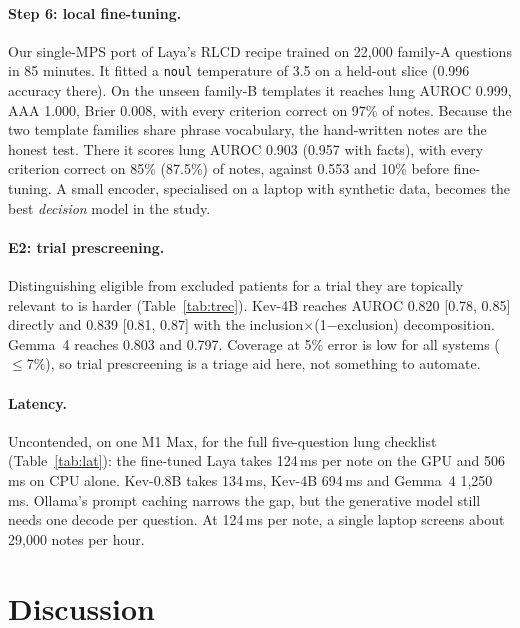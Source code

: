 \documentclass[11pt]{article}
\begin{document}
\paragraph{Step 6: local fine-tuning.}
Our single-MPS port of Laya's RLCD recipe trained on 22{,}000 family-A questions in 85 minutes. It fitted a \texttt{noul} temperature of 3.5 on a held-out slice (0.996 accuracy there).
On the unseen family-B templates it reaches lung AUROC 0.999, AAA 1.000, Brier 0.008, with every criterion correct on 97\% of notes.
Because the two template families share phrase vocabulary, the hand-written notes are the honest test.
There it scores lung AUROC 0.903 (0.957 with facts), with every criterion correct on 85\% (87.5\%) of notes, against 0.553 and 10\% before fine-tuning.
A small encoder, specialised on a laptop with synthetic data, becomes the best \emph{decision} model in the study.


\paragraph{E2: trial prescreening.}
Distinguishing eligible from excluded patients for a trial they are topically relevant to is harder (Table~\ref{tab:trec}).
Kev-4B reaches AUROC 0.820 [0.78, 0.85] directly and 0.839 [0.81, 0.87] with the inclusion$\times$(1$-$exclusion) decomposition.
Gemma~4 reaches 0.803 and 0.797.
Coverage at 5\% error is low for all systems ($\leq$7\%), so trial prescreening is a triage aid here, not something to automate.


\paragraph{Latency.}
Uncontended, on one M1 Max, for the full five-question lung checklist (Table~\ref{tab:lat}): the fine-tuned Laya takes 124\,ms per note on the GPU and 506\,ms on CPU alone.
Kev-0.8B takes 134\,ms, Kev-4B 694\,ms and Gemma~4 1{,}250\,ms.
Ollama's prompt caching narrows the gap, but the generative model still needs one decode per question.
At 124\,ms per note, a single laptop screens about 29{,}000 notes per hour.



\section{Discussion}
\end{document}
